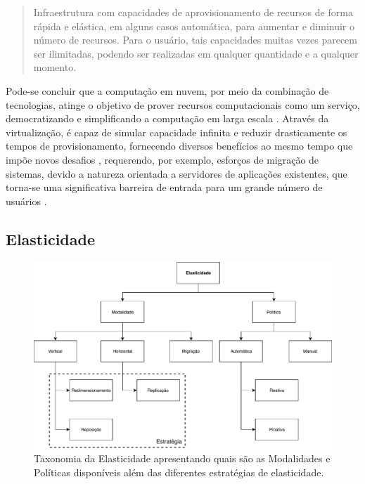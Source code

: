 \documentclass[english,brazilian]{UNISINOSmonografia} %
\newcommand\defaultFigureWidth{0.9}
\begin{document}
\begin{quote}
	Infraestrutura com capacidades de aprovisionamento de recursos de forma rápida e elástica, em alguns
	casos automática, para aumentar e diminuir o número de recursos. Para o usuário, tais capacidades muitas vezes
	parecem ser ilimitadas, podendo ser realizadas em qualquer quantidade e a qualquer momento.
\end{quote}

Pode-se concluir que a computação em nuvem, por meio da combinação de tecnologias, atinge o objetivo de prover recursos computacionais como um serviço, democratizando e simplificando a computação em larga escala \cite{Awada2017}.
Através da virtualização, é capaz de simular capacidade infinita e reduzir drasticamente os tempos de provisionamento, fornecendo diversos benefícios ao mesmo tempo que impõe novos desafios \cite{Zhang2010}, requerendo, por exemplo, esforços de migração de sistemas, devido a natureza orientada a servidores de aplicações existentes, que torna-se uma significativa barreira de entrada para um grande número de usuários \cite{Jonas2017}.


\subsection{Elasticidade}
\label{sec:elasticidade}


\begin{figure}[tb]
	\centering%
	\begin{minipage}{\defaultFigureWidth\textwidth}
		\caption{Taxonomia da Elasticidade apresentando quais são as Modalidades e Políticas disponíveis além das diferentes estratégias de elasticidade.}
		\label{fig:elasticidade-taxonomia}
		\vspace{1ex}
		\includegraphics[clip,width=\textwidth]{AUTOELASTIC-taxonomia}
	\end{minipage}
\end{figure}
\end{document}
